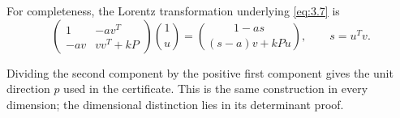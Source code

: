 For completeness, the Lorentz transformation underlying \eqref{eq:3.7} is
\begin{equation}\label{eq:10.27}
\begin{pmatrix}1&-av^T\\-av&vv^T+kP\end{pmatrix}\binom1u
=\binom{1-as}{(s-a)v+kPu},\qquad s=u^Tv.
\end{equation}

Dividing the second component by the positive first component gives the unit
direction $p$ used in the certificate. This is the same construction in every
dimension; the dimensional distinction lies in its determinant proof.
